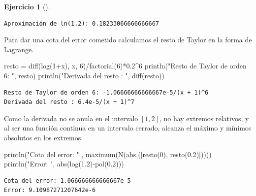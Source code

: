 \documentclass[
  a4paper,
]{scrreport}
\newenvironment{Shaded}{\begin{snugshade}}{\end{snugshade}}
\newcommand{\FloatTok}[1]{\textcolor[rgb]{0.68,0.00,0.00}{#1}}
\newcommand{\FunctionTok}[1]{\textcolor[rgb]{0.28,0.35,0.67}{#1}}
\newcommand{\NormalTok}[1]{\textcolor[rgb]{0.00,0.23,0.31}{#1}}
\newcommand{\OperatorTok}[1]{\textcolor[rgb]{0.37,0.37,0.37}{#1}}
\newcommand{\StringTok}[1]{\textcolor[rgb]{0.13,0.47,0.30}{#1}}
\theoremstyle{definition}
\newtheorem{exercise}{Ejercicio}[chapter]
\theoremstyle{remark}
\begin{document}
\begin{exercise}[]
\begin{tcolorbox}
\begin{verbatim}
Aproximación de ln(1.2): 0.18233066666666667
\end{verbatim}

Para dar una cota del error cometido calculamos el resto de Taylor en la
forma de Lagrange.

\begin{Shaded}
\begin{Highlighting}[]
\NormalTok{resto }\OperatorTok{=} \FunctionTok{diff}\NormalTok{(}\FunctionTok{log}\NormalTok{(}\FloatTok{1}\OperatorTok{+}\NormalTok{x), x, }\FloatTok{6}\NormalTok{)}\OperatorTok{/}\FunctionTok{factorial}\NormalTok{(}\FloatTok{6}\NormalTok{)}\OperatorTok{*}\FloatTok{0.2}\OperatorTok{\^{}}\FloatTok{6}
\FunctionTok{println}\NormalTok{(}\StringTok{"Resto de Taylor de orden 6: "}\NormalTok{, resto)}
\FunctionTok{println}\NormalTok{(}\StringTok{"Derivada del resto : "}\NormalTok{, }\FunctionTok{diff}\NormalTok{(resto))}
\end{Highlighting}
\end{Shaded}

\begin{verbatim}
Resto de Taylor de orden 6: -1.06666666666667e-5/(x + 1)^6
Derivada del resto : 6.4e-5/(x + 1)^7
\end{verbatim}

Como la derivada no se anula en el intervalo \([1,2]\), no hay extremos
relativos, y al ser una función continua en un intervalo cerrado,
alcanza el máximo y mínimos absolutos en los extremos.

\begin{Shaded}
\begin{Highlighting}[]
\FunctionTok{println}\NormalTok{(}\StringTok{"Cota del error: "}\NormalTok{ , }\FunctionTok{maximum}\NormalTok{(}\FunctionTok{N}\NormalTok{(}\FunctionTok{abs}\NormalTok{.([}\FunctionTok{resto}\NormalTok{(}\FloatTok{0}\NormalTok{), }\FunctionTok{resto}\NormalTok{(}\FloatTok{0.2}\NormalTok{)])))) }
\FunctionTok{println}\NormalTok{(}\StringTok{"Error: "}\NormalTok{, }\FunctionTok{abs}\NormalTok{(}\FunctionTok{log}\NormalTok{(}\FloatTok{1.2}\NormalTok{)}\FunctionTok{{-}pol}\NormalTok{(}\FloatTok{0.2}\NormalTok{)))}
\end{Highlighting}
\end{Shaded}

\begin{verbatim}
Cota del error: 1.066666666666667e-5
Error: 9.10987271207642e-6
\end{verbatim}


\end{tcolorbox}
\end{exercise}
\end{document}
